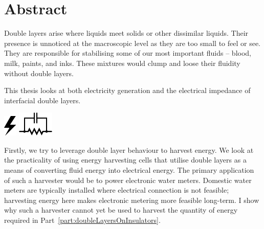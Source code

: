 





\rmfamily


\chapter*{Abstract}
  Double layers arise where liquids meet solids or other dissimilar liquids.
  Their presence is unnoticed at the macroscopic level as they are too small to feel or see.
  They are responsible for stabilising some of our most important fluids -- blood, milk, paints, and inks.
  These mixtures would clump and loose their fluidity without double layers.

  \vspace{-0.3cm}
  \begin{center}
    \parbox{8.8cm}{
      \begin{center}
        This thesis looks at both electricity generation and the electrical impedance of interfacial double layers.
      \end{center}
      \vspace{-1.35cm}
    }
    \vspace{-0.3cm}
    \parbox{15cm}{
        \hspace{0.8cm}
        \hbox{\vspace{-0.9cm}\includegraphics{graphics/logo_electricity}}
        \hbox{\hspace{9.8cm}\includegraphics{graphics/logo_impedance}}
    }
  \end{center}
  \vspace{0.5cm}

  Firstly, we try to leverage double layer behaviour to harvest energy.
  We look at the practicality of using energy harvesting cells that utilise double layers as a means of converting fluid energy into electrical energy.
  The primary application of such a harvester would be to power electronic water meters.
  Domestic water meters are typically installed where electrical connection is not feasible; harvesting energy here makes electronic metering more feasible long-term.
  I show why such a harvester cannot yet be used to harvest the quantity of energy required in Part~\ref{part:doubleLayersOnInsulators}.

